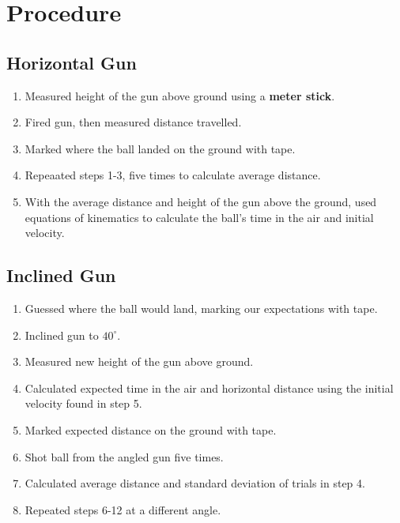 
\section{Procedure}
\vspace{-0.5cm}
\singlespacing



\subsection{Horizontal Gun}

	\begin{enumerate}
		\item Measured height of the gun above ground using a \textbf{meter stick}.
		\item Fired gun, then measured distance travelled. 
		\item Marked where the ball landed on the ground with tape.
		\item Repeaated steps 1-3, five times to calculate average distance.
		\item With the average distance and height of the gun above the ground, used equations of kinematics to calculate the ball's time in the air and initial velocity.
	\end{enumerate}	

\subsection{Inclined Gun}

	\begin{enumerate}[resume]
		\item Guessed where the ball would land, marking our expectations with tape.
		\item Inclined gun to  $40^\circ$.
		\item Measured new height of the gun above ground.
		\item Calculated expected time in the air and horizontal distance using the initial velocity found in step 5.
		\item Marked expected distance on the ground with tape.
		\item Shot ball from the angled gun five times.
		\item Calculated average distance and standard deviation of trials in step 4.
		\item Repeated steps 6-12 at a different angle.
	\end{enumerate}

\newpage





